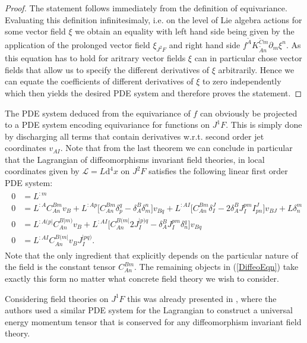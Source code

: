 \documentclass[a4paper,12pt, DIV=14, BCOR=5mm, twoside, headsepline]{scrbook}
\begin{document}
\begin{proof}
The statement follows immediately from the definition of equivariance. Evaluating this definition infinitesimaly, i.e. on the level of Lie algebra actions for some vector field $\xi$ we obtain an equality with left hand side being given by the application of the prolonged vector field $\xi_{J^2F}$ and right hand side $f^{\tilde{A}}K_{\tilde{A}n}^{\tilde{C}m} \partial_m \xi^n$. As this equation has to hold for aritrary vector fields $\xi$ can in particular chose vector fields that allow us to specify the different derivatives of $\xi$ arbitrarily. Hence we can equate the coefficients of different derivatives of $\xi$ to zero independently which then yields the desired PDE system and therefore proves the statement.  
\end{proof}
The PDE system deduced from the equivariance of $f$ can obviously be projected to a PDE system encoding equivariance for functions on $J^1F$. This is simply done by discharging all terms that contain derivatives w.r.t. second order jet coordinates $v_{AI}$.  
Note that from the last theorem we can conclude in particular that the Lagrangian of diffeomorphisms invariant field theories, in local coordinates given by $\mathcal{L} = L \mathrm{d}^4x$ on $J^2F$ satisfies the following linear first order PDE system:
\begin{align}\label{DiffeoEqn}
\begin{aligned}
    0 &= L^{:m} \\
    0 &= L^{:A} C_{An}^{Bm} v_B + L^{:Ap} \bigl[ C_{An}^{Bm} \delta_p^q - \delta_A^B \delta_m^n \bigr] v_{Bq} + L^{:AI} \bigl[ C_{An}^{Bm} \delta_I^J - 2 \delta_A^B J_I^{pm} I^J_{pn}  \bigr] v_{BJ} + L \delta^m_n \\
    0 &= L^{:A(p\vert}C_{An}^{B \vert m)} v_B + L^{: AI} \bigl[ C_{An}^{B(m\vert} 2 J_I^{\vert p) q} - \delta^B_A J_I ^{pm} \delta_n^q \bigr] v_{Bq} \\
    0 &= L^{:AI} C_{An}^{B(m\vert} v_B J_I^{\vert p q )}.
    \end{aligned}
\end{align}
Note that the only ingredient that explicitly depends on the particular nature of the field is the constant tensor $C^{Bm}_{An}$.
The remaining objects in (\ref{DiffeoEqn}) take exactly this form no matter what concrete field theory we wish to consider.

Considering field theories on $J^1F$ this was already presented in \cite{Gotay1992StressEnergyMomentumTA}, where the authors used a similar PDE system for the Lagrangian to construct a universal energy momentum tensor that is conserved for any diffeomorphism invariant field theory.
\end{document}
